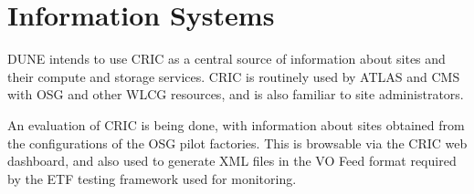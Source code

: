 \documentclass[../main-v1.tex]{subfiles}
\begin{document}
\chapter{Information Systems }
\label{ch:is}

DUNE intends to use CRIC as a central source of information about sites and their compute and storage services. CRIC is routinely used by ATLAS and CMS with OSG and other WLCG resources, and is also familiar to site administrators. 

An evaluation of CRIC is being done, with information about sites obtained from the configurations of the OSG pilot factories. This is browsable via the CRIC web dashboard, and also used to generate XML files in the VO Feed format required by the ETF testing framework used for monitoring.



\end{document}
